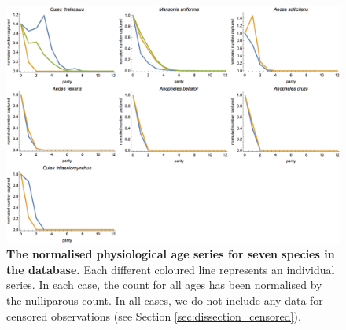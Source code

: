 \documentclass[12pt]{article}
\begin{document}
{\begin{figure}[ht]
	\centerline{\includegraphics[width=1.3\textwidth]{./Figure_files/dissection_parity_data3.png}}
	\caption{\textbf{The normalised physiological age series for seven species in the database.} Each different coloured line represents an individual series. In each case, the count for all ages has been normalised by the nulliparous count. In all cases, we do not include any data for censored observations (see Section \ref{sec:dissection_censored}).}\label{fig:dissection_exampleData3}
\end{figure}


}
\end{document}
